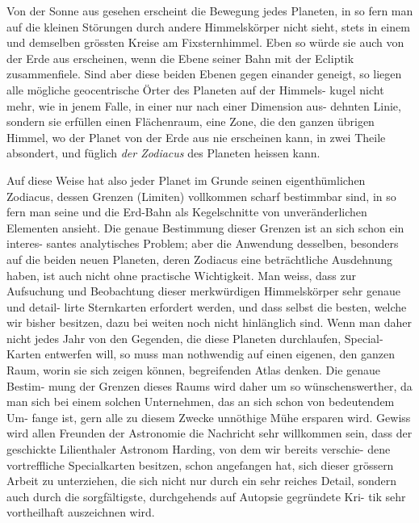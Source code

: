 \documentclass[12pt,a4paper]{article}
\begin{document}
\vspace{1em}

Von der Sonne aus gesehen erscheint die Bewegung jedes Planeten, in so
fern man auf die kleinen Störungen durch andere Himmelskörper nicht sieht,
stets in einem und demselben grössten Kreise am Fixsternhimmel. Eben so
würde sie auch von der Erde aus erscheinen, wenn die Ebene seiner Bahn mit
der Ecliptik zusammenfiele. Sind aber diese beiden Ebenen gegen einander
geneigt, so liegen alle mögliche geocentrische Örter des Planeten auf der Himmels-
kugel nicht mehr, wie in jenem Falle, in einer nur nach einer Dimension aus-
dehnten Linie, sondern sie erfüllen einen Flächenraum, eine Zone, die den
ganzen übrigen Himmel, wo der Planet von der Erde aus nie erscheinen kann,
in zwei Theile absondert, und füglich \emph{der Zodiacus} des Planeten heissen kann.

Auf diese Weise hat also jeder Planet im Grunde seinen eigenthümlichen
Zodiacus, dessen Grenzen (Limiten) vollkommen scharf bestimmbar sind, in so
fern man seine und die Erd-Bahn als Kegelschnitte von unveränderlichen Elementen
ansieht. Die genaue Bestimmung dieser Grenzen ist an sich schon ein interes-
santes analytisches Problem; aber die Anwendung desselben, besonders auf die
beiden neuen Planeten, deren Zodiacus eine beträchtliche Ausdehnung haben,
ist auch nicht ohne practische Wichtigkeit. Man weiss, dass zur Aufsuchung
und Beobachtung dieser merkwürdigen Himmelskörper sehr genaue und detail-
lirte Sternkarten erfordert werden, und dass selbst die besten, welche wir bisher
besitzen, dazu bei weiten noch nicht hinlänglich sind. Wenn man daher nicht
jedes Jahr von den Gegenden, die diese Planeten durchlaufen, Special-Karten
entwerfen will, so muss man nothwendig auf einen eigenen, den ganzen Raum,
worin sie sich zeigen können, begreifenden Atlas denken. Die genaue Bestim-
mung der Grenzen dieses Raums wird daher um so wünschenswerther, da man
sich bei einem solchen Unternehmen, das an sich schon von bedeutendem Um-
fange ist, gern alle zu diesem Zwecke unnöthige Mühe ersparen wird. Gewiss
wird allen Freunden der Astronomie die Nachricht sehr willkommen sein, dass
der geschickte Lilienthaler Astronom Harding, von dem wir bereits verschie-
dene vortreffliche Specialkarten besitzen, schon angefangen hat, sich dieser
grössern Arbeit zu unterziehen, die sich nicht nur durch ein sehr reiches Detail,
sondern auch durch die sorgfältigste, durchgehends auf Autopsie gegründete Kri-
tik sehr vortheilhaft auszeichnen wird.
\end{document}
